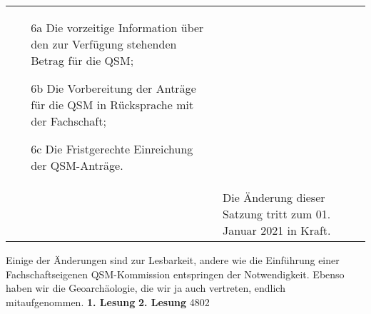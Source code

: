 {\begin{longtable}{|p{7.5cm}|p{7.5cm}|}
\begin{itemize}
        \item[6a] Die vorzeitige Information über den zur Verfügung stehenden Betrag für die QSM;
        \item[6b]Die Vorbereitung der Anträge für die QSM in Rücksprache mit der Fachschaft;
        \item[6c]   Die Fristgerechte Einreichung der QSM-Anträge.
        \end{itemize}\\
        & Die Änderung dieser Satzung tritt zum 01. Januar 2021 in Kraft.\\
    \end{longtable}
}{
    Einige der Änderungen sind zur Lesbarkeit, andere wie die Einführung einer Fachschaftseigenen QSM-Kommission entspringen der Notwendigkeit. Ebenso haben wir die Geoarchäologie, die wir ja auch vertreten, endlich mitaufgenommen.
}{
    \textbf{1. Lesung}
    \ul{
    }
    \textbf{2. Lesung}
    \ul{
    }
}{48}{0}{2}

